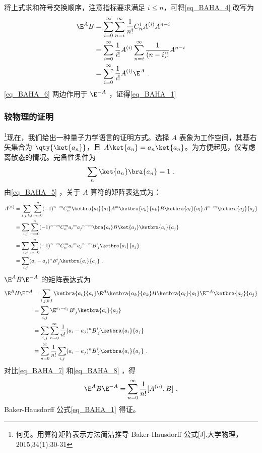 将上式求和符号交换顺序，注意指标要求满足 $i\leq n$，可将\autoref{eq_BAHA_4} 改写为
\begin{equation}\label{eq_BAHA_6}
\begin{aligned}
\E^A B&=\sum_{i=0}^{\infty}\sum_{n=i}^{\infty}\frac{1}{n!}C_{n}^iA^{(i)}A^{n-i}\\
&=\sum_{i=0}^{\infty}\frac{1}{i!}A^{(i)}\sum_{n=i}^{\infty}\frac{1}{(n-i)!}A^{n-i}\\
&=\sum_{i=0}^{\infty}\frac{1}{i!}A^{(i)}\E^A~.
\end{aligned}
\end{equation}
\autoref{eq_BAHA_6} 两边作用于 $\E^{-A}$ ，证得\autoref{eq_BAHA_1} 

\subsubsection{较物理的证明}
\footnote{何勇。用算符矩阵表示方法简洁推导 Baker-Hausdorff 公式[J].大学物理，2015,34(1):30-31}现在，我们给出一种量子力学语言的证明方式。选择 $A$ 表象为工作空间，其基右矢集合为 $\qty{\ket{a_n}}$，且 $A\ket{a_n}=a_n\ket{a_n}$。为方便起见，仅考虑离散态的情况。完备性条件为
\begin{equation}
\sum_{n}\ket{a_n}\bra{a_n}=1~.
\end{equation}
由\autoref{eq_BAHA_5} ，关于 $A$ 算符的矩阵表达式为：
\begin{equation}\label{eq_BAHA_7}
\begin{aligned}
A^{(n)}&=\sum_{i,j,k,l}\sum_{m=0}^{n}(-1)^{n-m}C_{n}^{m}\ketbra{a_i}{a_i}A^m\ketbra{a_k}{a_k}B\ketbra{a_l}{a_l}A^{n-m}\ketbra{a_j}{a_j}\\
&=\sum_{i,j}\sum_{m=0}^{n}(-1)^{n-m}C_n^m{a_i}^m{a_j}^{n-m}\bra{a_i}B\ket{a_j}\ketbra{a_i}{a_j}\\
&=\sum_{i,j}\sum_{m=0}^{n}(-1)^{n-m}C_n^m{a_i}^m{a_j}^{n-m}B^i_{\; j}\ketbra{a_i}{a_j}\\
&=\sum_{i,j}(a_i-a_j)^nB^i_{\; j}\ketbra{a_i}{a_j}~.
\end{aligned}
\end{equation}
$\E^{A}B\E^{-A}$ 的矩阵表达式为
\begin{equation}\label{eq_BAHA_8}
\begin{aligned}
\E^{A}B\E^{-A}&=\sum_{i,j,k,l}\ketbra{a_i}{a_i}\E^{A}\ketbra{a_k}{a_k}B\ketbra{a_l}{a_l}\E^{-A}\ketbra{a_j}{a_j}\\
&=\sum_{i,j}\E^{a_i-a_j}B^{i}_{\;j}\ketbra{a_i}{a_j}\\
&=\sum_{i,j}\sum_{n=0}^{\infty}\frac{1}{n!}(a_i-a_j)^nB^{i}_{\;j}\ketbra{a_i}{a_j}\\
&=\sum_{n=0}^{\infty}\frac{1}{n!}\sum_{i,j}(a_i-a_j)^nB^{i}_{\;j}\ketbra{a_i}{a_j}~.
\end{aligned}
\end{equation}
对比\autoref{eq_BAHA_7} 和\autoref{eq_BAHA_8} ，得
\begin{equation}
\E^{A}B\E^{-A}=\sum_{n=0}^{\infty}\frac{1}{n!}[A^{(n)},B]~,
\end{equation}
Baker-Hausdorff 公式\autoref{eq_BAHA_1} 得证。

